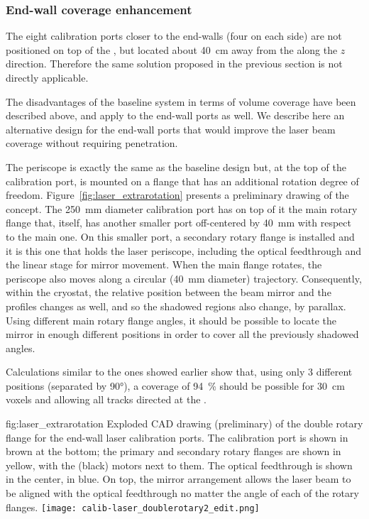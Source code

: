 


\subsubsection{End-wall coverage enhancement}

The eight calibration ports closer to the end-walls (four on each side) are not positioned on top of the , but located about \SI{40}{\cm} away from the  along the $z$ direction.
Therefore the same solution proposed in the previous section is not directly applicable.

The disadvantages of the baseline system in terms of volume coverage have been described above, and apply to the end-wall ports as well. 
We describe here an alternative design for the end-wall ports that would improve the laser beam coverage without requiring  penetration.

The periscope is exactly the same as the baseline design but, at the top of the calibration port, is mounted on a flange that has an additional rotation degree of freedom. Figure~\ref{fig:laser_extrarotation} presents a preliminary drawing of the concept. The \SI{250}{\milli\m} diameter calibration port has on top of it the main rotary flange that, itself, has another smaller port off-centered by \SI{40}{\milli\m} with respect to the main one. On this smaller port, a secondary rotary flange is installed and it is this one that holds the laser periscope, including the optical feedthrough and the linear stage for mirror movement. When the main flange rotates, the periscope also moves along a circular (\SI{40}{\milli\m} diameter) trajectory. Consequently, within the cryostat, the relative position between the beam mirror and the  profiles changes as well, and so the shadowed regions also change, by parallax. Using different main rotary flange angles, it should be possible to locate the mirror in enough different positions in order to cover all the previously shadowed angles.

Calculations similar to the ones showed earlier show that, using only \num{3} different positions (separated by \ang{90}), a coverage of \SI{94}{\%} should be possible for \SI{30}{\cm} voxels and allowing all tracks directed at the .

\begin{dunefigure}{fig:laser_extrarotation}
{Exploded CAD drawing (preliminary) of the double rotary flange for the end-wall laser calibration ports. The calibration port is shown in brown at the bottom; the primary and secondary rotary flanges are shown in yellow,  with the (black) motors next to them. The optical feedthrough is shown in the center, in blue. On top, the mirror arrangement allows the laser beam to be aligned with the optical feedthrough no matter the angle of each of the rotary flanges.}
\texttt{[image: calib-laser\_doublerotary2\_edit.png]}
\end{dunefigure}


